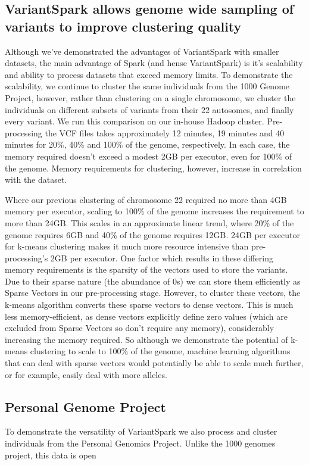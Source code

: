 \documentclass{bmcart}
\newcommand{\variantSpark}{{\sc VariantSpark}}
\begin{document}
\subsection*{\variantSpark{} allows genome wide sampling of variants to improve clustering quality}

Although we've demonstrated the advantages of \variantSpark{} with smaller datasets, the main advantage of {\sc Spark} (and hense \variantSpark) is it's scalability and ability to process datasets that exceed memory limits.
To demonstrate the scalability, we continue to cluster the same individuals from the 1000 Genome Project, however, rather than clustering on a single chromosome, we cluster the individuals on different subsets of variants from their 22 autosomes, and finally every variant.
We run this comparison on our in-house Hadoop cluster. Pre-processing the VCF files takes approximately 12 minutes, 19 minutes and 40 minutes for 20\%, 40\% and 100\% of the genome, respectively.
In each case, the memory required doesn't exceed a modest 2GB per executor, even for 100\% of the genome. Memory requirements for clustering, however, increase in correlation with the dataset. 

Where our previous clustering of chromosome 22 required no more than 4GB memory per executor, scaling to 100\% of the genome increases the requirement to more than 24GB. This scales in an approximate linear trend, where 20\% of the genome requires 6GB and 40\% of the genome requires 12GB.
24GB per executor for k-means clustering makes it much more resource intensive than pre-processing's 2GB per executor. 
One factor which results in these differing memory requirements is the sparsity of the vectors used to store the variants. Due to their sparse nature (the abundance of 0s) we can store them efficiently as Sparse Vectors in our pre-processing stage. However, to cluster these vectors, the k-means algorithm converts these sparse vectors to dense vectors. This is much less memory-efficient, as dense vectors explicitly define zero values (which are excluded from Sparse Vectors so don't require any memory), considerably increasing the memory required.
So although we demonstrate the potential of k-means clustering to scale to 100\% of the genome, machine learning algorithms that can deal with sparse vectors would potentially be able to scale much further, or for example, easily deal with more alleles.


\subsection*{Personal Genome Project}
To demonstrate the versatility of \variantSpark{} we also process and cluster individuals from the Personal Genomics Project. Unlike the 1000 genomes project, this data is open 
\end{document}

